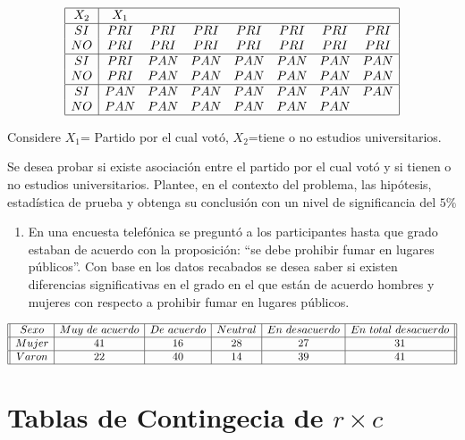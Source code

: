 \documentclass[a4paper,oneside,openany]{book}
\providecommand{\tightlist}{%
  \setlength{\itemsep}{0pt}\setlength{\parskip}{0pt}}
\begin{document}
\[
\begin{equation*}
\begin{array}{|c|c c c c c c c|}
\hline
X_{2}&X_{1}&&&&&&\\
 \hline
SI & PRI & PRI & PRI & PRI & PRI & PRI & PRI\\
NO & PRI & PRI & PRI & PRI & PRI & PRI & PRI\\
 \hline
SI & PRI & PAN & PAN & PAN & PAN & PAN &PAN\\
NO & PRI & PAN & PAN & PAN & PAN & PAN & PAN\\
 \hline
SI & PAN & PAN & PAN & PAN & PAN & PAN & PAN\\
NO & PAN & PAN & PAN & PAN & PAN & PAN&\\
 \hline
\end{array}
\end{equation*}
\]

Considere \(X_{1}\)= Partido por el cual votó, \(X_{2}\)=tiene o no
estudios universitarios.

Se desea probar si existe asociación entre el partido por el cual votó y
si tienen o no estudios universitarios. Plantee, en el contexto del
problema, las hipótesis, estadística de prueba y obtenga su conclusión
con un nivel de significancia del \(5\%\)

\begin{enumerate}
\def\labelenumi{\arabic{enumi}.}
\setcounter{enumi}{2}
\tightlist
\item
  En una encuesta telefónica se preguntó a los participantes hasta que
  grado estaban de acuerdo con la proposición: ``se debe prohibir fumar
  en lugares públicos''. Con base en los datos recabados se desea saber
  si existen diferencias significativas en el grado en el que están de
  acuerdo hombres y mujeres con respecto a prohibir fumar en lugares
  públicos.
\end{enumerate}

\[
\begin{equation*}
\begin{array}{||c |c |c |c| c | c ||}
\hline 
Sexo & Muy\ de\ acuerdo& De\ acuerdo & Neutral & En\ desacuerdo &  En\ total\ desacuerdo\\
\hline 
Mujer & 41 &  16 & 28 & 27 & 31\\
 \hline 
Varon & 22 & 40 & 14 & 39 & 41 \\
\hline 
\end{array}
\end{equation*}
\]

\chapter{\texorpdfstring{Tablas de Contingecia de
\(r\times c\)}{Tablas de Contingecia de r\textbackslash{}times c}}\label{tablas-de-contingecia-de-rtimes-c}
\end{document}

